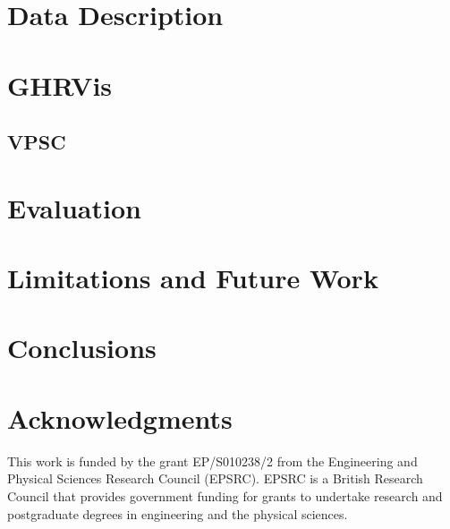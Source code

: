 \documentclass{egpubl}
\begin{document}
\newcommand{\expertcomment}[1]{\textit{``#1''}}

\newcommand{\task}[1]{\textbf{T#1}}
\newcommand{\req}[1]{\textbf{R#1}}

\maketitle

\begin{abstract}

\end{abstract}





\section{Data Description}

\section{GHRVis}

\subsection{VPSC}

\section{Evaluation}

\section{Limitations and Future Work}

\section{Conclusions}


\section{Acknowledgments}
This work is funded by the grant EP/S010238/2 from the Engineering and Physical Sciences Research Council (EPSRC). EPSRC is a British Research Council that provides government funding for grants to undertake research and postgraduate degrees in engineering and the physical sciences. 

\let\section=\origsection
\printbibliography
\end{document}
